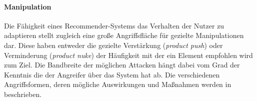 \paragraph{Manipulation} Die Fähigkeit eines Recommender-Systems das Verhalten der Nutzer zu adaptieren stellt zugleich eine große Angriffsfläche für gezielte Manipulationen dar. Diese haben entweder die gezielte Verstärkung (\textit{product push}) oder Verminderung (\textit{product nuke}) der Häufigkeit mit der ein Element empfohlen wird zum Ziel. Die Bandbreite der möglichen Attacken hängt dabei vom Grad der Kenntnis die der Angreifer über das System hat ab. Die verschiedenen Angriffsformen, deren mögliche Auswirkungen und Maßnahmen werden in \citep{hb_25} beschrieben. 

